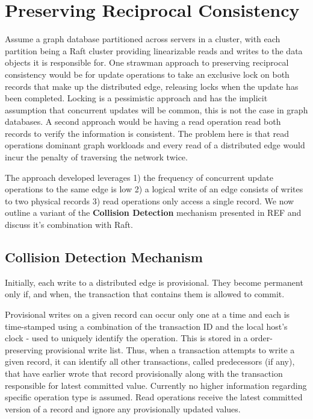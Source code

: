\documentclass[sigplan,screen]{acmart}
\begin{document}
\section{Preserving Reciprocal Consistency}
Assume a graph database partitioned across servers in a cluster, with each partition being a Raft cluster providing linearizable reads and writes to the data objects it is responsible for. One strawman approach to preserving reciprocal consistency would be for update operations to take an exclusive lock on both records that make up the distributed edge, releasing locks when the update has been completed. Locking is a pessimistic approach and has the implicit assumption that concurrent updates will be common, this is not the case in graph databases. A second approach would be having a read operation read both records to verify the information is consistent. The problem here is that read operations dominant graph workloads and every read of a distributed edge would incur the penalty of traversing the network twice.

The approach developed leverages 1) the frequency of concurrent update operations to the same edge is low 2) a logical write of an edge consists of writes to two physical records 3) read operations only access a single record. We now outline a variant of the \textbf{Collision Detection} mechanism presented in REF and discuss it's combination with Raft. %
\subsection{Collision Detection Mechanism}

Initially, each write to a distributed edge is provisional. They become permanent only if, and when, the transaction that contains them is allowed to commit.

Provisional writes on a given record can occur only one at a time and each is time-stamped using a combination of the transaction ID and the local host's clock - used to uniquely identify the operation. This is stored in a order-preserving provisional write list. Thus, when a transaction attempts to write a given record, it can identify all other transactions, called predecessors (if any), that have earlier wrote that record provisionally along with the transaction responsible for latest committed value. Currently no higher information regarding specific operation type is assumed. Read operations receive the latest committed version of a record and ignore any provisionally updated values.
\end{document}
